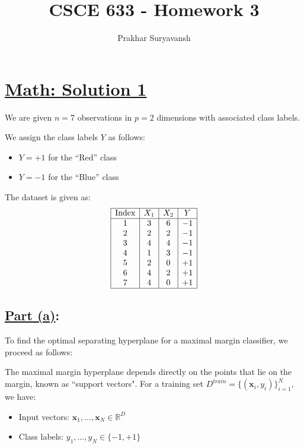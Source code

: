 \documentclass[12pt]{article}
\title{CSCE 633 - Homework 3}
\author{Prakhar Suryavansh}
\date{}
\begin{document}
\maketitle

\section*{\underline{Math: Solution 1}}

We are given \( n = 7 \) observations in \( p = 2 \) dimensions with associated class labels.

We assign the class labels \( Y \) as follows:
\begin{itemize}
  \item \( Y = +1 \) for the ``Red'' class
  \item \( Y = -1 \) for the ``Blue'' class
\end{itemize}

The dataset is given as:
\[
  \begin{array}{|c|c|c|c|}
    \hline
    \text{Index} & X_1 & X_2 & Y  \\
    \hline
    1            & 3   & 6   & -1 \\
    2            & 2   & 2   & -1 \\
    3            & 4   & 4   & -1 \\
    4            & 1   & 3   & -1 \\
    5            & 2   & 0   & +1 \\
    6            & 4   & 2   & +1 \\
    7            & 4   & 0   & +1 \\
    \hline
  \end{array}
\]

\subsection*{\underline{Part (a)}:}

To find the optimal separating hyperplane for a maximal margin classifier, we proceed as follows:

The maximal margin hyperplane depends directly on the points that lie on the margin, known as ``support vectors". For a training set \( D^{train} = \{(\mathbf{x}_i, y_i)\}_{i=1}^N \), we have:

\begin{itemize}
  \item Input vectors: \( \mathbf{x}_1, ..., \mathbf{x}_N \in \mathbb{R}^D \)
  \item Class labels: \( y_1, ..., y_N \in \{-1, +1\} \)
\end{itemize}
\end{document}
